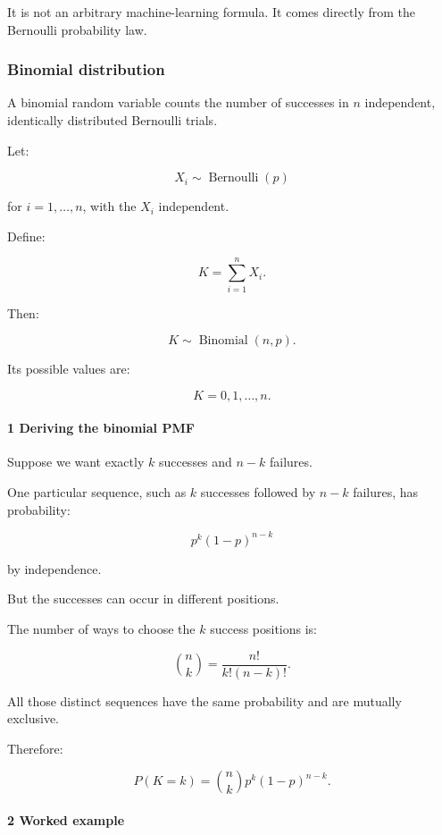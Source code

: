 It is not an arbitrary machine-learning formula. It comes directly from the Bernoulli probability law.

\subsubsection{Binomial distribution}\label{binomial-distribution}

A binomial random variable counts the number of successes in \(n\) independent, identically distributed Bernoulli trials.

Let:

\[
 X_i\sim\operatorname{Bernoulli}(p)
\]

for \(i=1,\ldots,n\), with the \(X_i\) independent.

Define:

\[
 K=\sum_{i=1}^nX_i.
\]

Then:

\[
 \boxed{K\sim\operatorname{Binomial}(n,p)}.
\]

Its possible values are:

\[
 K=0,1,\ldots,n.
\]

\paragraph{1 Deriving the binomial PMF}\label{deriving-the-binomial-pmf}

Suppose we want exactly \(k\) successes and \(n-k\) failures.

One particular sequence, such as \(k\) successes followed by \(n-k\) failures, has probability:

\[
 p^k(1-p)^{n-k}
\]

by independence.

But the successes can occur in different positions.

The number of ways to choose the \(k\) success positions is:

\[
 \binom nk= \frac{n!}{k!(n-k)!}.
\]

All those distinct sequences have the same probability and are mutually exclusive.

Therefore:

\[
 \boxed{ P(K=k) = \binom nkp^k(1-p)^{n-k} }.
\]

\paragraph{2 Worked example}\label{worked-example}

